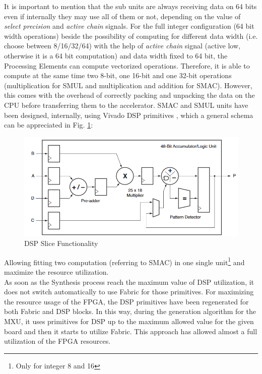 It is important to mention that the sub units are always receiving data on 64 bits even if internally they may use all of them or not, depending on the value of \textit{select precision} and \textit{active chain} signals. For the full integer configuration (64 bit width operations) beside the possibility of computing for different data width (i.e. choose between 8/16/32/64) with the help of \textit{active chain} signal (active low, otherwise it is a 64 bit computation) and data width fixed to 64 bit, the Processing Elements can compute vectorized operations. Therefore, it is able to compute at the same time two 8-bit, one 16-bit and one 32-bit operations (multiplication for SMUL and multiplication and addition for SMAC).
However, this comes with the overhead of correctly packing and unpacking the data on the CPU before transferring them to the accelerator.
\newpage
SMAC and SMUL units have been designed, internally, using Vivado DSP primitives \cite{paper:48}, which a general schema can be appreciated in Fig. \ref{fig:dsp}:
\begin{figure}[H]
\centering
\captionsetup{justification=centering}
\includegraphics[scale=0.5,angle=0]{./figure/vivado_dsp.png}
\caption{DSP Slice Functionality\cite{paper:48}}
\label{fig:dsp}
\end{figure} 
Allowing fitting two computation (referring to SMAC) in one single unit\footnote{Only for integer 8 and 16} and maximize the resource utilization.\\

As soon as the Synthesis process reach the maximum value of DSP utilization, it does not switch automatically to use Fabric for those primitives. For maximizing the resource usage of the FPGA, the DSP primitives have been regenerated for both Fabric and DSP blocks. In this way, during the generation algorithm for the MXU, it uses primitives for DSP up to the maximum allowed value for the given board and then it starts to utilize Fabric.
This approach has allowed almost a full utilization of the FPGA resources.
